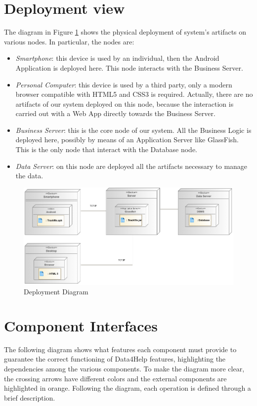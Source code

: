 \section{Deployment view}



The diagram in Figure \ref{f:depl_diag} shows the physical deployment of system's artifacts on various nodes.
In particular, the nodes are:

\begin{itemize}
\item \textit{Smartphone}: this device is used by an individual, then the Android Application is deployed here. This node interacts with the Business Server.
\item \textit{Personal Computer}: this device is used by a third party, only a modern browser compatible with HTML5 and CSS3 is required. Actually, there are no artifacts of our system deployed on this node, because the interaction is carried out with a Web App directly towards the Business Server.
\item \textit{Business Server}: this is the core node of our system.
All the Business Logic is deployed here, possibly by means of an Application Server like GlassFish.
This is the only node that interact with the Database node.
\item \textit{Data Server}: on this node are deployed all the artifacts necessary to manage the data.
\end{itemize}


\begin{figure}[h]
\centering
\includegraphics[width=\linewidth]{resources/uml/depldiag}
\caption{Deployment Diagram}\label{f:depl_diag}
\end{figure}

\section{Component Interfaces}
The following diagram shows what features each component must provide to guarantee the correct functioning of Data4Help features, highlighting the dependencies among the various components.
To make the diagram more clear, the crossing arrows have different colors and the external components are highlighted in orange.
Following the diagram, each operation is defined through a brief description.


